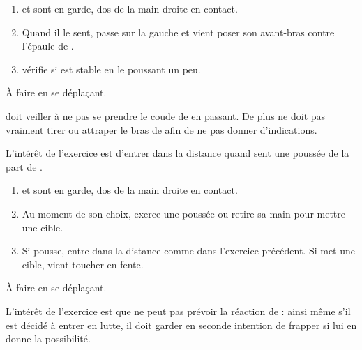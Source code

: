 \begin{exercice}

\begin{enumerate}
	\item \A et \D sont en garde, dos de la main droite en contact.
	
	\item Quand il le sent, \A passe sur la gauche et vient poser son avant-bras contre l'épaule de \D.
	
	\item \D vérifie si \A est stable en le poussant un peu.
\end{enumerate}

À faire en se déplaçant.

\A doit veiller à ne pas se prendre le coude de \D en passant.
De plus \A ne doit pas vraiment tirer ou attraper le bras de \D afin de ne pas donner d'indications.

L'intérêt de l'exercice est d'entrer dans la distance quand \A sent une poussée de la part de \D.

\end{exercice}


\begin{exercice}

\begin{enumerate}
	\item \A et \D sont en garde, dos de la main droite en contact.
	
	\item Au moment de son choix, \D exerce une poussée ou retire sa main pour mettre une cible.
	
	\item Si \D pousse, \A entre dans la distance comme dans l'exercice précédent. Si \D met une cible, \A vient toucher en fente.
\end{enumerate}

À faire en se déplaçant.

L'intérêt de l'exercice est que \A ne peut pas prévoir la réaction de \D : ainsi même s'il est décidé à entrer en lutte, il doit garder en seconde intention de frapper si \D lui en donne la possibilité.

\end{exercice}


